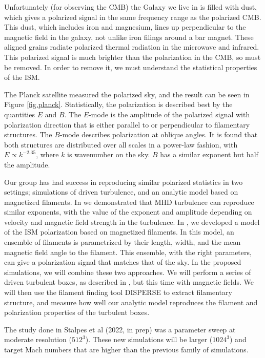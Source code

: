 Unfortunately (for observing the CMB) the Galaxy we live in is filled with dust,
which gives a polarized signal in the same frequency range as the polarized CMB.
This dust, which includes iron and magnesium, lines up perpendicular to the magnetic
field in the galaxy, not unlike iron filings around a bar magnet.  These aligned
grains radiate polarized thermal radiation in the microwave and infrared.  This
polarized signal is much brighter than the polarization in the CMB, so must be
removed.  In order to remove it, we must understand the statistical properties
of the ISM.

The Planck satellite  measured the polarized sky, and the result can be
seen in Figure \ref{fig.planck}.  Statistically, the polarization is described best
by the quantities $E$ and $B$.  The $E$-mode is the amplitude of the polarized
signal with polarization direction
that is either parallel to or perpendicular to filamentary structures.   The
$B$-mode
describes polarization at oblique angles.  It is found that both structures are
distributed over all scales in a power-law fashion, with $E \propto k^{-2.35}$,
where $k$ is wavenumber on the sky. $B$ has a similar exponent but half the
amplitude.  

Our group has had success in reproducing similar polarized statistics in two
settings; simulations of driven turbulence, and an analytic model based on
magnetized filaments.
In  we demonstrated that MHD turbulence can reproduce
similar exponents, with the value of the exponent and amplitude depending on
velocity and magnetic field strength in the turbulence.  In
\citet{Huffenberger20}, we developed a model of the ISM polarization based on
magnetized filaments.   In this model, an ensemble of filaments is parametrized
by their length, width, and the mean magnetic field angle to the filament.  This
ensemble, with the right parameters, can give a polarization signal that matches
that of the sky.
In the proposed simulations, we will combine these two approaches.  We will
perform a series of driven turbulent boxes, as described in , but this
time with magnetic fields.  We will then use the filament finding tool DISPERSE
 to extract filamentary structure, and measure how well our
analytic model reproduces the filament and polarization properties of the
turbulent boxes.

The study done in Stalpes et al (2022, in prep) was a parameter sweep at
moderate resolution ($512^3$).  These new simulations will be larger ($1024^3$)
and target Mach numbers that are higher than the previous family of simulations.

